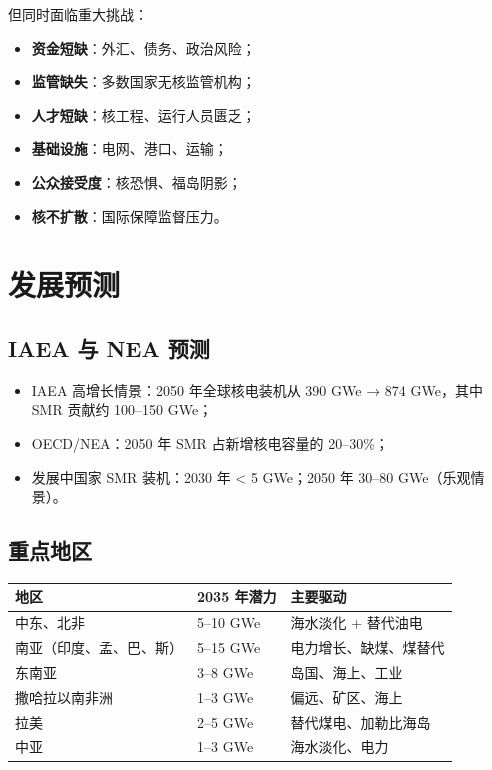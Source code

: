 \documentclass[
  UTF8,
  scheme=plain,
  fontsize=10pt,
  openany
]{ctexbook}
\begin{document}
但同时面临重大挑战：

\begin{itemize}
\tightlist
\item
  \textbf{资金短缺}：外汇、债务、政治风险；
\item
  \textbf{监管缺失}：多数国家无核监管机构；
\item
  \textbf{人才短缺}：核工程、运行人员匮乏；
\item
  \textbf{基础设施}：电网、港口、运输；
\item
  \textbf{公众接受度}：核恐惧、福岛阴影；
\item
  \textbf{核不扩散}：国际保障监督压力。
\end{itemize}

\section{发展预测}\label{ux53d1ux5c55ux9884ux6d4b}

\subsection{IAEA 与 NEA 预测}\label{iaea-ux4e0e-nea-ux9884ux6d4b}

\begin{itemize}
\tightlist
\item
  IAEA 高增长情景：2050 年全球核电装机从 390 GWe → 874 GWe，其中 SMR
  贡献约 100--150 GWe；
\item
  OECD/NEA：2050 年 SMR 占新增核电容量的 20--30\%；
\item
  发展中国家 SMR 装机：2030 年 \textless{} 5 GWe；2050 年 30--80
  GWe（乐观情景）。
\end{itemize}

\subsection{重点地区}\label{ux91cdux70b9ux5730ux533a}

{\def\LTcaptype{none} %
\begin{longtable}[]{@{}lll@{}}
\toprule\noalign{}
地区 & 2035 年潜力 & 主要驱动 \\
\midrule\noalign{}
\endhead
\bottomrule\noalign{}
\endlastfoot
中东、北非 & 5--10 GWe & 海水淡化 + 替代油电 \\
南亚（印度、孟、巴、斯） & 5--15 GWe & 电力增长、缺煤、煤替代 \\
东南亚 & 3--8 GWe & 岛国、海上、工业 \\
撒哈拉以南非洲 & 1--3 GWe & 偏远、矿区、海上 \\
拉美 & 2--5 GWe & 替代煤电、加勒比海岛 \\
中亚 & 1--3 GWe & 海水淡化、电力 \\
\end{longtable}
}
\end{document}
